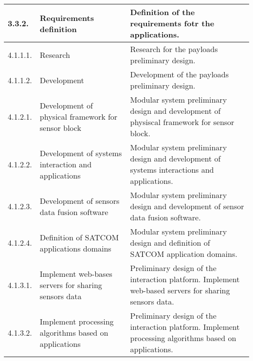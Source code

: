 \begin{longtable}[H]{l >{\raggedright\arraybackslash}p{4cm} p{8cm}}
	\midrule
	
	3.3.2. & Requirements definition & Definition of the requirements fotr the applications.\vspace{0.2cm} \\
	
	\midrule
	
	4.1.1.1. & Research & Research for the payloads preliminary design.\vspace{0.2cm} \\
	
	\midrule
	
	4.1.1.2. & Development & Development of the payloads preliminary design.\vspace{0.2cm} \\
	
	\midrule

	4.1.2.1. & Development of physical framework for sensor block & Modular system preliminary design and development of physiscal framework for sensor block.\vspace{0.2cm} \\
	
	\midrule
	
	4.1.2.2. & Development of systems interaction and applications & Modular system preliminary design and development of systems interactions and applications.\vspace{0.2cm} \\
	
	\midrule
	
	4.1.2.3. & Development of sensors data fusion software & Modular system preliminary design and development of sensor data fusion software.\vspace{0.2cm} \\
	
	\midrule
	
	4.1.2.4. & Definition of SATCOM applications domains & Modular system preliminary design and definition of SATCOM application domains.\vspace{0.2cm} \\
	
	\midrule
	
	4.1.3.1. & Implement web-bases servers for sharing sensors data & Preliminary design of the interaction platform. Implement web-based servers for sharing sensors data.\vspace{0.2cm} \\
	
	\midrule
	
	4.1.3.2. & Implement processing algorithms based on applications & Preliminary design of the interaction platform. Implement processing algorithms based on applications.\vspace{0.2cm} \\
	

\end{longtable}
